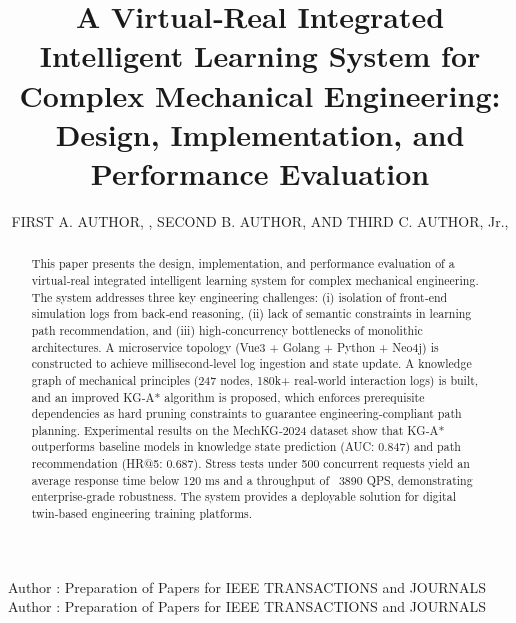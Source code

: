 \documentclass{ieeeaccess}
\begin{document}

\title{A Virtual‑Real Integrated Intelligent Learning System for Complex Mechanical Engineering: Design, Implementation, and Performance Evaluation}
\author{\uppercase{First A. Author}, ,
\uppercase{Second B. Author}, AND \uppercase{Third C. Author},
Jr.,
}

\address[1]{National Institute of Standards and
Technology, Boulder, CO 80305 USA (e-mail: author@boulder.nist.gov)}
\address[2]{Department of Physics, Colorado State University, Fort Collins,
CO 80523 USA (e-mail: author@lamar.colostate.edu)}
\address[3]{Electrical Engineering Department, University of Colorado, Boulder, CO
80309 USA}

\markboth
{Author \headeretal: Preparation of Papers for IEEE TRANSACTIONS and JOURNALS}
{Author \headeretal: Preparation of Papers for IEEE TRANSACTIONS and JOURNALS}



\begin{abstract}
This paper presents the design, implementation, and performance evaluation of a virtual‑real integrated intelligent learning system for complex mechanical engineering. 
The system addresses three key engineering challenges: (i) isolation of front‑end simulation logs from back‑end reasoning, (ii) lack of semantic constraints in learning path recommendation, and (iii) high‑concurrency bottlenecks of monolithic architectures. A microservice topology (Vue3 + Golang + Python + Neo4j) is constructed to achieve millisecond‑level log ingestion and state update. A knowledge graph of mechanical principles (247 nodes, 180k+ real‑world interaction logs) is built, and an improved KG‑A* algorithm is proposed, which enforces prerequisite dependencies as hard pruning constraints to guarantee engineering‑compliant path planning. Experimental results on the MechKG‑2024 dataset show that KG‑A* outperforms baseline models in knowledge state prediction (AUC: 0.847) and path recommendation (HR@5: 0.687). Stress tests under 500 concurrent requests yield an average response time below 120 ms and a throughput of ~3890 QPS, demonstrating enterprise‑grade robustness. The system provides a deployable solution for digital twin‑based engineering training platforms.
\end{abstract}
\end{document}
